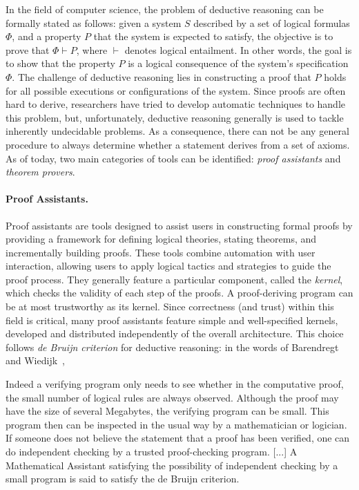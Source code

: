 In the field of computer science, the problem of deductive reasoning can be formally stated as follows: given a system $S$ described by a set of logical formulas $\Phi$, and a property $P$ that the system is expected to satisfy, the objective is to prove that $\Phi \vdash P$, where $\vdash$ denotes logical entailment. In other words, the goal is to show that the property $P$ is a logical consequence of the system's specification $\Phi$. The challenge of deductive reasoning lies in constructing a proof that $P$ holds for all possible executions or configurations of the system. Since proofs are often hard to derive, researchers have tried to develop automatic techniques to handle this problem, but, unfortunately, deductive reasoning generally is used to tackle inherently undecidable problems. As a consequence, there can not be any general procedure to always determine whether a statement derives from a set of axioms. As of today, two main categories of tools can be identified: \textit{proof assistants} and \textit{theorem provers}.

\paragraph{\textbf{Proof Assistants}.}
Proof assistants are tools designed to assist users in constructing formal proofs by providing a framework for defining logical theories, stating theorems, and incrementally building proofs. These tools combine automation with user interaction, allowing users to apply logical tactics and strategies to guide the proof process. They generally feature a particular component, called the \textit{kernel}, which checks the validity of each step of the proofs.  A proof-deriving program can be at most trustworthy as its kernel. Since correctness (and trust) within this field is critical, many proof assistants feature simple and well-specified kernels, developed and distributed independently of the overall architecture. This choice follows \textit{de Bruijn criterion} for deductive reasoning: in the words of Barendregt and Wiedijk~\cite{challengeofmaths},

\begin{displayquote}
Indeed a verifying program only needs to see whether in the computative proof, the small number of logical rules are always observed. Although the proof may have the size of several Megabytes, the verifying program can be small. This program then can be inspected in the usual way by a mathematician or logician. If someone does not believe the statement that a proof has been verified, one can do independent checking by a trusted proof-checking program. [...] A Mathematical Assistant satisfying the possibility of independent checking by a small program is said to satisfy the de Bruijn criterion.
\end{displayquote}

